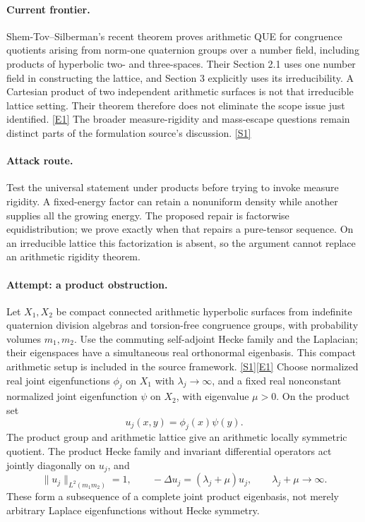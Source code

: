 \documentclass[11pt,a4paper]{article}
\newcommand{\sref}[2]{\hyperlink{source:#1:#2}{[S#2]}}
\newcommand{\eref}[2]{\hyperlink{extra:#1:#2}{[E#2]}}
\numberwithin{equation}{section}
\begin{document}
\paragraph{Current frontier.}
Shem-Tov--Silberman's recent theorem proves arithmetic QUE for congruence
quotients arising from norm-one quaternion groups over a number field,
including products of hyperbolic two- and three-spaces. Their Section 2.1
uses one number field in constructing the lattice, and Section 3 explicitly
uses its irreducibility. A Cartesian product of two independent arithmetic
surfaces is not that irreducible lattice setting. Their theorem therefore
does not eliminate the scope issue just identified. \eref{20003326}{1}
The broader measure-rigidity and mass-escape questions remain distinct
parts of the formulation source's discussion. \sref{20003326}{1}

\paragraph{Attack route.}
Test the universal statement under products before trying to invoke measure
rigidity. A fixed-energy factor can retain a nonuniform density while
another supplies all the growing energy. The proposed repair is factorwise
equidistribution; we prove exactly when that repairs a pure-tensor sequence.
On an irreducible lattice this factorization is absent, so the argument
cannot replace an arithmetic rigidity theorem.

\paragraph{Attempt: a product obstruction.}
Let $X_1,X_2$ be compact connected arithmetic hyperbolic surfaces from
indefinite quaternion division algebras and torsion-free congruence groups,
with probability volumes $m_1,m_2$. Use the commuting self-adjoint Hecke
family and the Laplacian; their eigenspaces have a simultaneous real
orthonormal eigenbasis. This compact arithmetic setup is included in the
source framework. \sref{20003326}{1}\eref{20003326}{1}
Choose normalized real joint eigenfunctions $\phi_j$ on $X_1$ with
$\lambda_j\to\infty$, and a fixed real nonconstant normalized joint
eigenfunction $\psi$ on $X_2$, with eigenvalue $\mu>0$. On the product set
\[
 u_j(x,y)=\phi_j(x)\psi(y).
\]
The product group and arithmetic lattice give an arithmetic locally
symmetric quotient. The product Hecke family and invariant differential
operators act jointly diagonally on $u_j$, and
\[
 \|u_j\|_{L^2(m_1m_2)}=1,
 \qquad -\Delta u_j=(\lambda_j+\mu)u_j,
 \qquad \lambda_j+\mu\longrightarrow\infty.
\]
These form a subsequence of a complete joint product eigenbasis, not merely
arbitrary Laplace eigenfunctions without Hecke symmetry.
\end{document}
